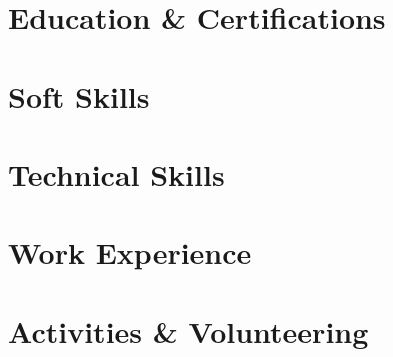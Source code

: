 \documentclass[letter,10pt]{article}
\begin{document}


\section{Education \& Certifications}


\section{Soft Skills}


\section{Technical Skills}



\section{Work Experience}



\section{Activities \& Volunteering}

\end{document}

